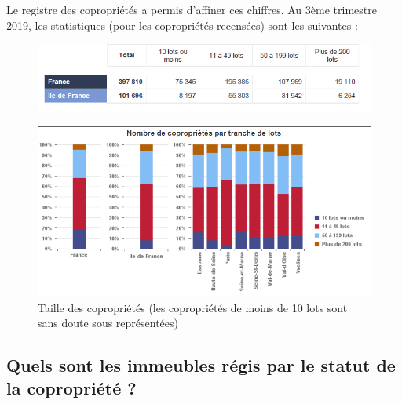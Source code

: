 	Le registre des copropriétés a permis d’affiner ces chiffres. Au 3ème trimestre 2019, les
	statistiques (pour les copropriétés recensées) sont les suivantes :
	\begin{figure}[h]
		\centering
		\includegraphics[width=0.7\linewidth]{images/nombreDeCoproprietesParLots}
		\caption[Nombre de copropriétés par lots]{}
		\label{fig:nombredecoproprietesparlots}
	\end{figure}
	
	\begin{figure}[h]
		\centering
		\includegraphics[width=0.7\linewidth]{images/tailleDesCoproprietes}
		\caption[Taille des copropriétés]{Taille des copropriétés (les copropriétés de moins de 10 lots sont sans doute sous représentées)}
		\label{fig:tailledescoproprietes}
	\end{figure}
	
	\subsection{Quels sont les immeubles régis par le statut de la copropriété ?}
	

